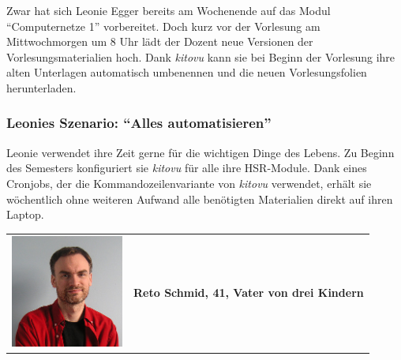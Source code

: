 \documentclass[a4paper]{article}
\begin{document}
Zwar hat sich Leonie Egger bereits am Wochenende auf das Modul ``Computernetze 1'' vorbereitet. Doch kurz vor der Vorlesung am Mittwochmorgen um 8 Uhr lädt der Dozent neue Versionen der Vorlesungsmaterialien hoch. Dank \emph{kitovu} kann sie bei Beginn der Vorlesung ihre alten Unterlagen automatisch umbenennen und die neuen Vorlesungsfolien herunterladen.

\subsubsection{Leonies Szenario: ``Alles automatisieren''}

Leonie verwendet ihre Zeit gerne für die wichtigen Dinge des Lebens. Zu Beginn des Semesters konfiguriert sie \emph{kitovu} für alle ihre HSR-Module. Dank eines Cronjobs, der die Kommandozeilenvariante von \emph{kitovu} verwendet, erhält sie wöchentlich ohne weiteren Aufwand alle benötigten Materialien direkt auf ihren Laptop.

\pagebreak
\begin{tabulary}{\linewidth}{m{10em}l}
	\includegraphics[width=10em]{./img/userpersonaimages02.png} & \textbf{{\large Reto Schmid, 41, Vater von drei Kindern}} \\
\end{tabulary}
\end{document}

